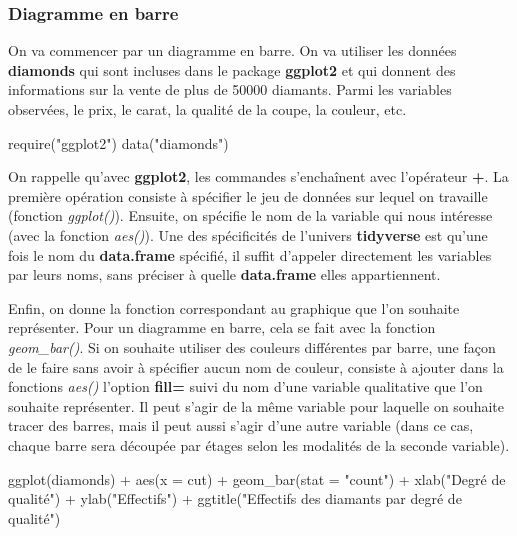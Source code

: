 \documentclass[
]{book}
\newenvironment{Shaded}{\begin{snugshade}}{\end{snugshade}}
\newcommand{\AttributeTok}[1]{\textcolor[rgb]{0.77,0.63,0.00}{#1}}
\newcommand{\FunctionTok}[1]{\textcolor[rgb]{0.00,0.00,0.00}{#1}}
\newcommand{\NormalTok}[1]{#1}
\newcommand{\SpecialCharTok}[1]{\textcolor[rgb]{0.00,0.00,0.00}{#1}}
\newcommand{\StringTok}[1]{\textcolor[rgb]{0.31,0.60,0.02}{#1}}
\theoremstyle{definition}
\theoremstyle{definition}
\theoremstyle{definition}
\theoremstyle{definition}
\theoremstyle{remark}
\begin{document}
\hypertarget{diagramme-en-barre}{%
\subsubsection{Diagramme en barre}\label{diagramme-en-barre}}

On va commencer par un diagramme en barre. On va utiliser les données \textbf{diamonds} qui sont incluses dans le package \textbf{ggplot2} et qui donnent des informations sur la vente de plus de 50000 diamants. Parmi les variables observées, le prix, le carat, la qualité de la coupe, la couleur, etc.

\begin{Shaded}
\begin{Highlighting}[]
\FunctionTok{require}\NormalTok{(}\StringTok{"ggplot2"}\NormalTok{)}
\FunctionTok{data}\NormalTok{(}\StringTok{"diamonds"}\NormalTok{)}
\end{Highlighting}
\end{Shaded}

On rappelle qu'avec \textbf{ggplot2}, les commandes s'enchaînent avec l'opérateur \textbf{+}. La première opération consiste à spécifier le jeu de données sur lequel on travaille (fonction \emph{ggplot()}). Ensuite, on spécifie le nom de la variable qui nous intéresse (avec la fonction \emph{aes()}). Une des spécificités de l'univers \textbf{tidyverse} est qu'une fois le nom du \textbf{data.frame} spécifié, il suffit d'appeler directement les variables par leurs noms, sans préciser à quelle \textbf{data.frame} elles appartiennent.

Enfin, on donne la fonction correspondant au graphique que l'on souhaite représenter. Pour un diagramme en barre, cela se fait avec la fonction \emph{geom\_bar()}. Si on souhaite utiliser des couleurs différentes par barre, une façon de le faire sans avoir à spécifier aucun nom de couleur, consiste à ajouter dans la fonctions \emph{aes()} l'option \textbf{fill=} suivi du nom d'une variable qualitative que l'on souhaite représenter. Il peut s'agir de la même variable pour laquelle on souhaite tracer des barres, mais il peut aussi s'agir d'une autre variable (dans ce cas, chaque barre sera découpée par étages selon les modalités de la seconde variable).

\begin{Shaded}
\begin{Highlighting}[]
\FunctionTok{ggplot}\NormalTok{(diamonds) }\SpecialCharTok{+}
  \FunctionTok{aes}\NormalTok{(}\AttributeTok{x =}\NormalTok{ cut) }\SpecialCharTok{+}
  \FunctionTok{geom\_bar}\NormalTok{(}\AttributeTok{stat =} \StringTok{"count"}\NormalTok{) }\SpecialCharTok{+} 
  \FunctionTok{xlab}\NormalTok{(}\StringTok{"Degré de qualité"}\NormalTok{) }\SpecialCharTok{+}
  \FunctionTok{ylab}\NormalTok{(}\StringTok{"Effectifs"}\NormalTok{) }\SpecialCharTok{+}
  \FunctionTok{ggtitle}\NormalTok{(}\StringTok{"Effectifs des diamants par degré de qualité"}\NormalTok{)}
\end{Highlighting}
\end{Shaded}
\end{document}
